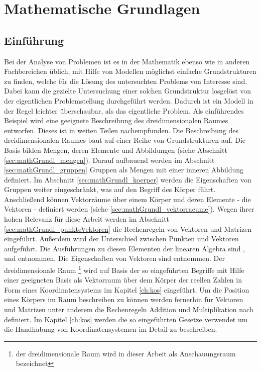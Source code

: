 \chapter{Mathematische Grundlagen}\label{ch:mathGrundl}
\section{Einf\"uhrung}\label{sec:mathGrundl_einfuehrung}
    Bei der Analyse von Problemen ist es in der Mathematik  ebenso wie in anderen Fachbereichen \"ublich, mit Hilfe von Modellen m\"oglichst einfache Grundstrukturen zu finden, welche f\"ur die L\"osung des untersuchten Problems von Interesse sind. Dabei kann die gezielte Untersuchung einer solchen Grundstruktur losgel\"ost von der eigentlichen Problemstellung durchgef\"uhrt werden. Dadurch ist ein Modell in der Regel leichter \"uberschaubar, als das eigentliche Problem. \hfill \newline
    Als einf\"uhrendes Beispiel wird eine geeignete Beschreibung des dreidimensionalen Raumes entworfen. Dieses ist in weiten Teilen \cite{Bosch2014} nachempfunden. \hfill \newline
    Die Beschreibung des dreidimensionalen Raumes baut auf einer Reihe von Grundstrukturen auf. Die Basis bilden Mengen, deren Elemente und Abbildungen (siehe Abschnitt \ref{sec:mathGrundl_mengen}). Darauf aufbauend werden im Abschnitt \ref{sec:mathGrundl_gruppen} Gruppen als Mengen mit einer inneren Abbildung  definiert. Im Abschnitt \ref{sec:mathGrundl_koerper} werden die Eigenschaften von Gruppen weiter eingeschr\"ankt, was auf den Begriff des K\"orper f\"uhrt. Anschlie\ss{}end k\"onnen Vektorr\"aume \"uber einem K\"orper und deren Elemente - die Vektoren - definiert werden (siehe \ref{sec:mathGrundl_vektorraeume}). Wegen ihrer hohen Relevanz f\"ur diese Arbeit werden im Abschnitt \ref{sec:mathGrundl_punkteVektoren} die Rechenregeln von Vektoren und Matrizen eingef\"uhrt. Au\ss{}erdem wird der Unterschied zwischen Punkten und Vektoren aufgef\"uhrt. Die Ausf\"uhrungen zu diesen Elementen der linearen Algebra sind \cite{Bosch2014}, \cite{MatthiasPlaue2009} und \cite{Modler2011d} entnommen. Die Eigenschaften von Vektoren sind \cite{Papula2014} entnommen. \newline
    Der dreidimensionale Raum \footnote{der dreidimensionale Raum wird in dieser Arbeit als Anschauungsraum bezeichnet} wird auf Basis der so eingef\"uhrten Begriffe mit Hilfe einer geeigneten Basis als Vektorraum \"uber dem K\"orper der reellen Zahlen in Form eines Koordinatensystems im Kapitel \ref{ch:kos} eingef\"uhrt.   \newline
    Um die Position eines K\"orpers im Raum beschreiben zu k\"onnen werden fernerhin f\"ur Vektoren und Matrizen unter anderem die Rechenregeln Addition und Multiplikation nach \cite{Papula2014} definiert. Im Kapitel \ref{ch:kos} werden die so eingef\"uhrten Gesetze verwendet um die Handhabung von Koordinatensystemen im Detail zu beschreiben. \newline
    
